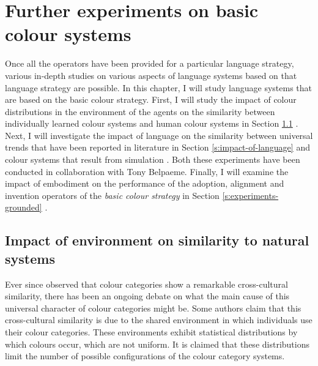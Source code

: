 \chapter{Further experiments on basic colour systems}
\label{s:basic-experiments}

Once all the operators have been provided for a particular language
strategy, various in-depth studies on various aspects of language
systems based on that language strategy are possible. In this chapter,
I will study language systems that are based on the basic colour
strategy. First, I will study the impact of colour distributions in
the environment of the agents on the similarity between individually
learned colour systems and human colour systems in Section
\ref{s:impact-of-environment} \citep{belpaeme09impact}. Next, I will
investigate the impact of language on the similarity between universal
trends that have been reported in literature in Section
\ref{s:impact-of-language} and colour systems that result from
simulation \citep{belpaeme05eelc, belpaeme05explaining,
  belpaeme07language}. Both these experiments have been conducted in
collaboration with Tony Belpaeme. Finally, I will examine the impact
of embodiment on the performance of the adoption, alignment and
invention operators of the \emph{basic colour strategy} in Section
\ref{s:experiments-grounded} \citep{bleys09grounded}.

\section{Impact of environment on similarity to natural systems}
\label{s:impact-of-environment}

Ever since \cite{berlin69basic} observed that colour categories show a
remarkable cross-cultural similarity, there has been an
ongoing debate on what the main cause of this universal character of
colour categories might be. Some authors
\citep{vanwijk59crosscultural, shepard92perceptual,
  yendrikhovskij01computational} claim that this cross-cultural
similarity is due to the shared environment in which individuals use
their colour categories. These environments exhibit statistical
distributions by which colours occur, which are not uniform. It is
claimed that these distributions limit the number of possible
configurations of the colour category systems.

